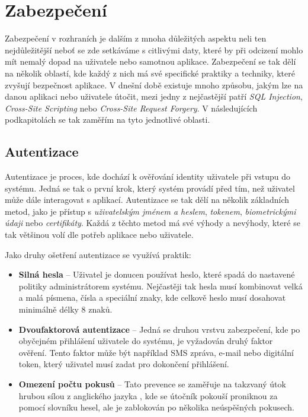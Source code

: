 \section{Zabezpečení}
\label{sec:security}
Zabezpečení v rozhraních je dalším z mnoha důležitých aspektu neli ten nejdůležitější neboť se zde setkáváme s citlivými daty, které by při odcizení mohlo mít nemalý dopad na uživatele nebo samotnou aplikace. Zabezpečení se tak dělí na několik oblastí, kde každý z nich má své specifické praktiky a techniky, které zvyšují bezpečnost aplikace. V dnešní době existuje mnoho způsobu, jakým lze na danou aplikaci nebo uživatele útočit, mezi jedny z nejčastější patří \textit{SQL Injection}, \textit{Cross-Site Scripting} nebo \textit{Cross-Site Request Forgery}. V následujících podkapitolách se tak zaměřím na tyto jednotlivé oblasti.

\subsection{Autentizace}
\label{subsec:security-authentication}
Autentizace je proces, kde dochází k ověřování identity uživatele při vstupu do systému. Jedná se tak o první krok, který systém provádí před tím, než uživatel může dále interagovat s aplikací. Autentizace se tak dělí na několik základních metod, jako je přístup s \textit{uživatelským jménem a heslem}, \textit{tokenem}, \textit{biometrickými údaji} nebo \textit{certifikáty}. Každá z těchto metod má své výhody a nevýhody, které se tak většinou volí dle potřeb aplikace nebo uživatele.

Jako druhy ošetření autentizace se využívá praktik:
\begin{itemize}
    \item \textbf{Silná hesla} -- Uživatel je donucen používat heslo, které spadá do nastavené politiky administrátorem systému. Nejčastěji tak hesla musí kombinovat velká a malá písmena, čísla a speciální znaky, kde celkově heslo musí dosahovat minimálně délky 8 znaků.
    \item \textbf{Dvoufaktorová autentizace} -- Jedná se druhou vrstvu zabezpečení, kde po obyčejném přihlášení uživatele do systému, je vyžadován druhý faktor ověření. Tento faktor může být například SMS zpráva, e-mail nebo digitální token, který uživatel musí zadat pro dokončení přihlášení.
    \item \textbf{Omezení počtu pokusů} -- Tato prevence se zaměřuje na takzvaný útok hrubou sílou z anglického jazyka \textit{}, kde se útočník pokouší proniknou za pomocí slovníku hesel, ale je zablokován po několika neúspěšných pokusech.
\end{itemize}

